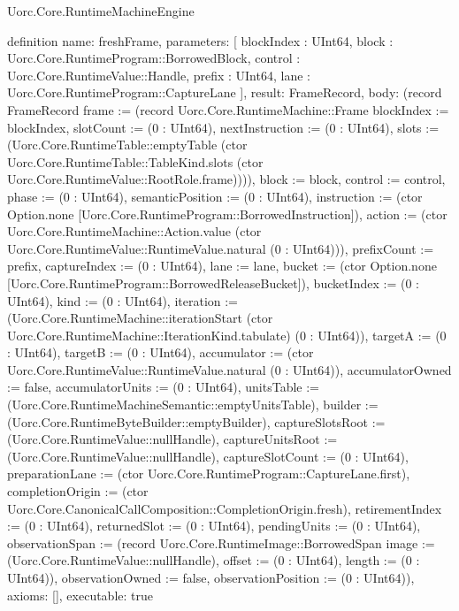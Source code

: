\begin{lexlean}{Uorc.Core.RuntimeMachineEngine}
\begin{semanticmodule}
definition{
  name: freshFrame,
  parameters: [
    blockIndex : UInt64,
    block : Uorc.Core.RuntimeProgram::BorrowedBlock,
    control : Uorc.Core.RuntimeValue::Handle,
    prefix : UInt64,
    lane : Uorc.Core.RuntimeProgram::CaptureLane
  ],
  result: FrameRecord,
  body: (record FrameRecord {frame := (record Uorc.Core.RuntimeMachine::Frame {blockIndex := blockIndex, slotCount := (0 : UInt64), nextInstruction := (0 : UInt64), slots := (Uorc.Core.RuntimeTable::emptyTable (ctor Uorc.Core.RuntimeTable::TableKind.slots (ctor Uorc.Core.RuntimeValue::RootRole.frame)))}), block := block, control := control, phase := (0 : UInt64), semanticPosition := (0 : UInt64), instruction := (ctor Option.none [Uorc.Core.RuntimeProgram::BorrowedInstruction]), action := (ctor Uorc.Core.RuntimeMachine::Action.value (ctor Uorc.Core.RuntimeValue::RuntimeValue.natural (0 : UInt64))), prefixCount := prefix, captureIndex := (0 : UInt64), lane := lane, bucket := (ctor Option.none [Uorc.Core.RuntimeProgram::BorrowedReleaseBucket]), bucketIndex := (0 : UInt64), kind := (0 : UInt64), iteration := (Uorc.Core.RuntimeMachine::iterationStart (ctor Uorc.Core.RuntimeMachine::IterationKind.tabulate) (0 : UInt64)), targetA := (0 : UInt64), targetB := (0 : UInt64), accumulator := (ctor Uorc.Core.RuntimeValue::RuntimeValue.natural (0 : UInt64)), accumulatorOwned := false, accumulatorUnits := (0 : UInt64), unitsTable := (Uorc.Core.RuntimeMachineSemantic::emptyUnitsTable), builder := (Uorc.Core.RuntimeByteBuilder::emptyBuilder), captureSlotsRoot := (Uorc.Core.RuntimeValue::nullHandle), captureUnitsRoot := (Uorc.Core.RuntimeValue::nullHandle), captureSlotCount := (0 : UInt64), preparationLane := (ctor Uorc.Core.RuntimeProgram::CaptureLane.first), completionOrigin := (ctor Uorc.Core.CanonicalCallComposition::CompletionOrigin.fresh), retirementIndex := (0 : UInt64), returnedSlot := (0 : UInt64), pendingUnits := (0 : UInt64), observationSpan := (record Uorc.Core.RuntimeImage::BorrowedSpan {image := (Uorc.Core.RuntimeValue::nullHandle), offset := (0 : UInt64), length := (0 : UInt64)}), observationOwned := false, observationPosition := (0 : UInt64)}),
  axioms: [],
  executable: true
}


\end{semanticmodule}
\end{lexlean}
